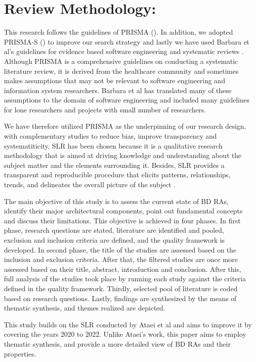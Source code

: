 \documentclass[review]{elsarticle}
\begin{document}
\section{Review Methodology:}
This research follows the guidelines of PRISMA (\cite{page2021prisma}). In addition, we adopted PRISMA-S (\cite{rethlefsen2021prisma}) to improve our search strategy and lastly we have used Barbara et al's guidelines for evidence based software engineering and systematic reviews \cite{kitchenham2015evidence}. Although PRISMA is a comprehensive guidelines on conducting a systematic literature review, it is derived from the healthcare community and sometimes makes assumptions that may not be relevant to software engineering and information system researchers. Barbara et al \cite{kitchenham2015evidence} has translated many of these assumptions to the domain of software engineering and included many guidelines for lone researchers and projects with small number of researchers. 

We have therefore utilized PRISMA as the underpinning of our research design, with complementary studies to reduce bias, improve transparency and systematiticity. SLR has been chosen because it is a qualitative research methodology that is aimed at driving knowledge and understanding about the subject matter and the elements surrounding it. Besides, SLR provides a transparent and reproducible procedure that elicits patterns, relationships, trends, and delineates the overall picture of the subject \cite{borrego2014systematic}.

The main objective of this study is to assess the current state of BD RAs, identify their major architectural components, point out fundamental concepts and discuss their limitations. This objective is achieved in four phases. In first phase, research questions are stated, literature are identified and pooled, exclusion and inclusion criteria are defined, and the quality framework is developed. In second phase, the title of the studies are assessed based on the inclusion and exclusion criteria. After that, the filtered studies are once more assessed based on their title, abstract, introduction and conclusion. After this, full analysis of the studies took place by running each study against the criteria defined in the quality framework. Thirdly, selected pool of literature is coded based on research questions. Lastly, findings are synthesized by the means of thematic synthesis, and themes realized are depicted.

This study builds on the SLR conducted by Ataei et al \cite{AtaeiACIS} and aims to improve it by covering the years 2020 to 2022. Unlike Ataei's work, this paper aims to employ thematic synthesis, and provide a more detailed view of BD RAs and their properties.
\end{document}
